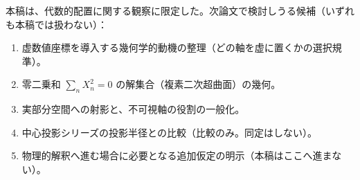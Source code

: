 \documentclass[11pt,a4paper]{ltjsarticle}
\providecommand{\tightlist}{\setlength{\itemsep}{0pt}\setlength{\parskip}{0pt}}
\begin{document}
本稿は、代数的配置に関する観察に限定した。次論文で検討しうる候補（いずれも本稿では扱わない）：

\begin{enumerate}
\def\labelenumi{\arabic{enumi}.}
\tightlist
\item
  虚数値座標を導入する幾何学的動機の整理（どの軸を虚に置くかの選択規準）。
\item
  零二乗和 \(\sum_n X_n^2=0\) の解集合（複素二次超曲面）の幾何。
\item
  実部分空間への射影と、不可視軸の役割の一般化。
\item
  中心投影シリーズの投影半径との比較（比較のみ。同定はしない）。
\item
  物理的解釈へ進む場合に必要となる追加仮定の明示（本稿はここへ進まない）。
\end{enumerate}
\end{document}
